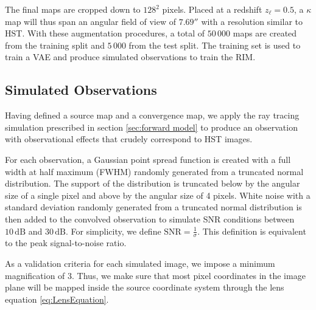 The final maps are cropped down to $128^2$ pixels.
Placed at a redshift $z_\ell=0.5$, a $\kappa$ map will thus span an angular field of view of $7.69''$ with 
a resolution similar to HST. 
With these augmentation procedures, a total of $50\,000$ maps are created from the training split and 
$5\,000$ from the test split.
The training set is used to train a VAE and produce simulated observations 
to train the RIM. 

\subsection{Simulated Observations}\label{sec:simulated observation}
Having defined a source map and a convergence map, we apply the ray tracing simulation 
prescribed in section \ref{sec:forward model} to produce an observation 
with observational effects that crudely correspond to HST images. 

For each observation, a Gaussian point spread function is 
created with a full width at half maximum (FWHM) 
randomly generated from a truncated normal distribution.
The support of the distribution is truncated below by the 
angular size of a single pixel and above by the angular size of 4 pixels. 
White noise with a standard deviation randomly generated from a truncated normal distribution 
is then added to the convolved observation to simulate SNR conditions between 
$10\,\mathrm{dB}$ and $30\,\mathrm{dB}$. For simplicity, we define $\mathrm{SNR} = \frac{1}{\sigma}$. 
This definition is equivalent to the peak signal-to-noise ratio. 

As a validation criteria for each simulated image, we impose 
a minimum magnification of 3. Thus, 
we make sure that most pixel coordinates in the image plane will be mapped inside the 
source coordinate system through the lens equation \eqref{eq:LensEquation}. 

